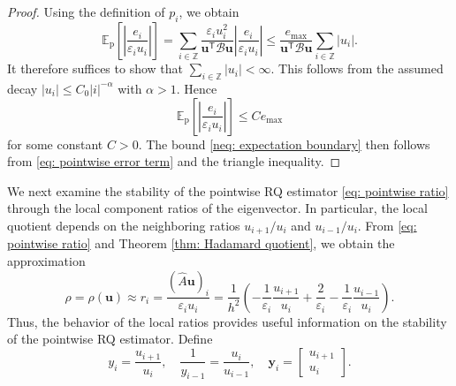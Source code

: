 \documentclass[11pt]{article}
\def\u{\mathbf{u}}
\newtheorem{cor}[thm]{Corollary}
\numberwithin{equation}{section}
\begin{document}
\begin{proof}
Using the definition of $p_i$, we obtain
\[
\mathbb{E}_{\mathrm{p}}\left[\left| \frac{e_i}{\varepsilon_i u_i} \right|\right]
=
\sum_{i\in\mathbb{Z}}
\frac{\varepsilon_i u_i^2}{\boldsymbol{u}^\mathsf{T}\mathcal{B}\boldsymbol{u}}
\left| \frac{e_i}{\varepsilon_i u_i} \right|
\le
\frac{e_{\max}}{\boldsymbol{u}^\mathsf{T}\mathcal{B}\boldsymbol{u}}
\sum_{i\in\mathbb{Z}} |u_i|.
\]
It therefore suffices to show that $\sum_{i\in\mathbb{Z}} |u_i|<\infty$. This follows from the assumed decay $|u_i|\le C_0 |i|^{-\alpha}$ with $\alpha>1$. Hence
$$
\mathbb{E}_{\mathrm{p}}\left[\left| \frac{e_i}{\varepsilon_i u_i} \right|\right]
\le
C e_{\max}
$$
for some constant $C>0$. The bound \eqref{neq: expectation boundary} then follows from \eqref{eq: pointwise error term} and the triangle inequality.
\end{proof}


We next examine the stability of the pointwise RQ estimator \eqref{eq: pointwise ratio} through the local component ratios of the eigenvector. In particular, the local quotient depends on the neighboring ratios $u_{i+1}/u_i$ and $u_{i-1}/u_i$. From \eqref{eq: pointwise ratio} and Theorem \ref{thm: Hadamard quotient}, we obtain the approximation
\begin{equation} \label{def: ratio estimate}
\rho = \rho(\boldsymbol{u}) \approx r_i
= \frac{(\widehat{A}\u)_i}{\varepsilon_i u_i}
= \frac{1}{h^2}\left(-\frac{1}{\varepsilon_i}\frac{u_{i+1}}{u_i}
+ \frac{2}{\varepsilon_i}
- \frac{1}{\varepsilon_i}\frac{u_{i-1}}{u_i}\right).
\end{equation}
Thus, the behavior of the local ratios provides useful information on the stability of the pointwise RQ estimator. Define
\begin{equation} \label{def: local ratio}
y_i = \frac{u_{i+1}}{u_i},
\quad
\frac{1}{y_{i-1}} = \frac{u_i}{u_{i-1}},
\quad
\boldsymbol{y}_i = \begin{bmatrix}
    u_{i+1} \\ u_i
\end{bmatrix}.
\end{equation}
\end{document}
